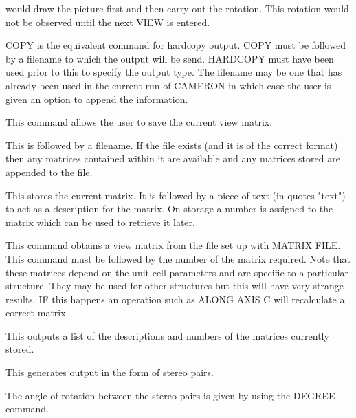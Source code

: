 \documentclass[10pt,a4paper]{report}
\begin{document}
would draw the picture first and then carry out the rotation.
This
rotation would not be observed until the next VIEW is entered.





\bigskip{}




COPY is the equivalent command for hardcopy output. COPY must be
followed by a filename to which the output will be send. HARDCOPY must
have been used prior to this to specify the output type. The filename
may be one that has already been used in the current run of CAMERON in
which case the user is given an option to append the information.





\bigskip{}


This command allows the user to save the current view matrix.


\bigskip{}
This is followed by a filename. If the file exists (and it is of the
correct format) then any matrices contained within it are available and
any matrices stored are appended to the file.


\bigskip{}
This stores the current matrix. It is followed by a piece of text (in
quotes "text") to act as a description for the matrix. On storage a number
is assigned to the matrix which can be used to retrieve it later.


\bigskip{}
This command obtains a view matrix from the file set up with MATRIX
FILE. This command must be followed by the number of the matrix
required. Note that these matrices depend on the unit cell parameters and
are specific to a particular structure. They may be used for other
structures but this will have very strange results. IF this happens an
operation such as ALONG AXIS C will recalculate a correct matrix.


\bigskip{}
This outputs a list of the descriptions and numbers of the matrices
currently stored.





\bigskip{}


This generates output in the form of stereo pairs.


\bigskip{}
The angle of rotation between the stereo pairs is given by using the 
DEGREE command.


\bigskip{}
\end{document}
